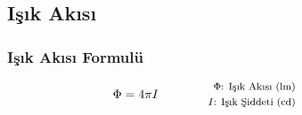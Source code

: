 \subsection{Işık Akısı}

\subsubsection*{Işık Akısı Formulü}
\begin{equation}
    \Phi = 4\pi I \qquad \qquad \parbox{4cm}{\footnotesize$\begin{aligned}
        \Phi\text{: Işık Akısı (lm) } \\
        I\text{: Işık Şiddeti (cd) }
\end{aligned}$}
\end{equation}
